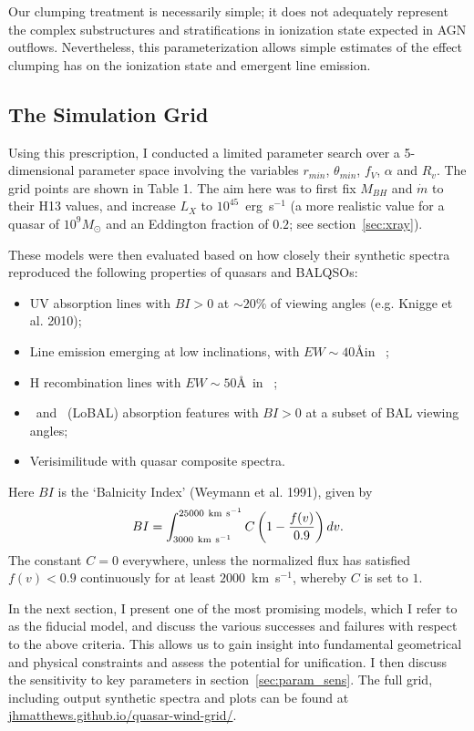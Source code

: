 Our clumping treatment is necessarily simple; it does not adequately
represent the complex substructures and stratifications in ionization
state expected in AGN outflows. 
Nevertheless, this parameterization 
allows simple estimates of the effect clumping has on the ionization 
state and emergent line emission.


\subsection{The Simulation Grid}

Using this prescription, I conducted a limited parameter
search over a 5-dimensional parameter space involving the 
variables $r_{min}$, $\theta_{min}$, $f_V$, $\alpha$ and $R_v$.
The grid points are shown in Table 1.
The aim here was to first fix $M_{BH}$ and $\dot{m}$ to their H13 values,
and increase $L_X$ to $10^{45}$~erg~s$^{-1}$ (a more realistic value for a 
quasar of $10^9M_\odot$ and an Eddington fraction of $0.2$; see section~\ref{sec:xray}).

These models were then evaluated based on 
how closely their synthetic spectra reproduced the 
following properties of quasars and BALQSOs:

\begin{itemize}
\item UV absorption lines 
with $BI > 0$ at $\sim20\%$ of viewing angles (e.g. Knigge et al. 2010);
\item Line emission emerging at low inclinations, with $EW\sim40$\AA in \civline\ \citep[e.g. ][]{shen2011};
\item H recombination lines with $EW\sim50$\AA\ in \la\ \citep[e.g. ][]{shen2011};
\item  \mg\ and \al\ (LoBAL) absorption features with $BI > 0$ at a subset of 
BAL viewing angles;
\item Verisimilitude with quasar composite spectra.
\end{itemize}
Here $BI$ is the `Balnicity Index' (Weymann et al. 1991), given by
\begin{equation}
BI = \int^{25000~{\rm km~s}^{-1}}_{3000~{\rm km~s}^{-1}} C \left( 1 - \frac{f(v)}{0.9} \right) dv.
\end{equation}
The constant $C=0$ everywhere, unless the normalized flux
has satisfied $f(v)<0.9$ continuously for at least $2000$~km~s$^{−1}$, 
whereby $C$ is set to $1$.

In the next section, I present one of the most promising models,
which I refer to as the fiducial model, and discuss
the various successes and failures with respect to the above criteria.
This allows us to gain insight into fundamental geometrical 
and physical constraints and assess the potential for unification. 
I then discuss the sensitivity to key parameters in section~\ref{sec:param_sens}.
The full grid, including output synthetic spectra and plots can be found at
\url{jhmatthews.github.io/quasar-wind-grid/}.

